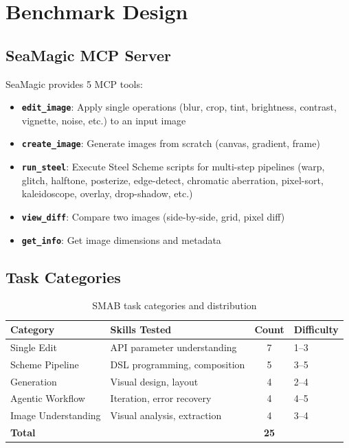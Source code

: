 \documentclass[11pt,a4paper]{article}
\begin{document}
\section{Benchmark Design}

\subsection{SeaMagic MCP Server}

SeaMagic provides 5 MCP tools:

\begin{itemize}
    \item \textbf{\texttt{edit\_image}}: Apply single operations (blur, crop, tint, brightness, contrast, vignette, noise, etc.) to an input image
    \item \textbf{\texttt{create\_image}}: Generate images from scratch (canvas, gradient, frame)
    \item \textbf{\texttt{run\_steel}}: Execute Steel Scheme scripts for multi-step pipelines (warp, glitch, halftone, posterize, edge-detect, chromatic aberration, pixel-sort, kaleidoscope, overlay, drop-shadow, etc.)
    \item \textbf{\texttt{view\_diff}}: Compare two images (side-by-side, grid, pixel diff)
    \item \textbf{\texttt{get\_info}}: Get image dimensions and metadata
\end{itemize}

\subsection{Task Categories}

\begin{table}[h]
\centering
\caption{SMAB task categories and distribution}
\label{tab:categories}
\begin{tabular}{llcl}
\toprule
\textbf{Category} & \textbf{Skills Tested} & \textbf{Count} & \textbf{Difficulty} \\
\midrule
Single Edit & API parameter understanding & 7 & 1--3 \\
Scheme Pipeline & DSL programming, composition & 5 & 3--5 \\
Generation & Visual design, layout & 4 & 2--4 \\
Agentic Workflow & Iteration, error recovery & 4 & 4--5 \\
Image Understanding & Visual analysis, extraction & 4 & 3--4 \\
\midrule
\textbf{Total} & & \textbf{25} & \\
\bottomrule
\end{tabular}
\end{table}
\end{document}

